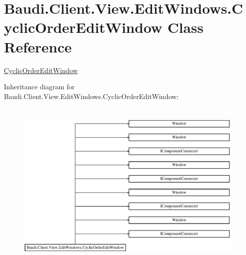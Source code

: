 \hypertarget{class_baudi_1_1_client_1_1_view_1_1_edit_windows_1_1_cyclic_order_edit_window}{}\section{Baudi.\+Client.\+View.\+Edit\+Windows.\+Cyclic\+Order\+Edit\+Window Class Reference}
\label{class_baudi_1_1_client_1_1_view_1_1_edit_windows_1_1_cyclic_order_edit_window}


\hyperlink{class_baudi_1_1_client_1_1_view_1_1_edit_windows_1_1_cyclic_order_edit_window}{Cyclic\+Order\+Edit\+Window}  


Inheritance diagram for Baudi.\+Client.\+View.\+Edit\+Windows.\+Cyclic\+Order\+Edit\+Window\+:\begin{figure}[H]
\begin{center}
\leavevmode
\includegraphics[height=8.383233cm]{class_baudi_1_1_client_1_1_view_1_1_edit_windows_1_1_cyclic_order_edit_window}
\end{center}
\end{figure}
